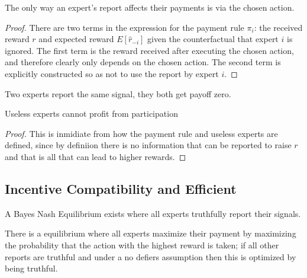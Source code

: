 \begin{lem}
	The only way an expert's report affects their payments is via the chosen action.
\end{lem}

\begin{proof}
There are two terms in the expression for the payment rule $\pi_i$: the received reward $r$ and expected reward $E[\hat{r}_{-i}]$ given the counterfactual that expert $i$ is ignored. 
The first term is the reward received after executing the chosen action, and therefore clearly only depends on the chosen action. 
The second term is explicitly constructed so as not to use the report by expert $i$. 
\end{proof}

\begin{lem}
	Two experts report the same signal, they both get payoff zero. 
\end{lem}




\begin{lem}
	Useless experts cannot profit from participation
\end{lem}

\begin{proof}
This is inmidiate from how the payment rule and useless experts are defined, since by definiion there is no information that can be reported to raise $r$ and that is all that can lead to higher rewards.
\end{proof}


\subsection{Incentive Compatibility and Efficient}

\begin{defn}
	A Bayes Nash Equilibrium exists where all experts truthfully report their signals.
\end{defn}

There is a  equilibrium where all experts maximize their payment by maximizing the probability that the action with the highest reward is taken; if all other reports are truthful and under a no defiers assumption then this is optimized by being truthful.

